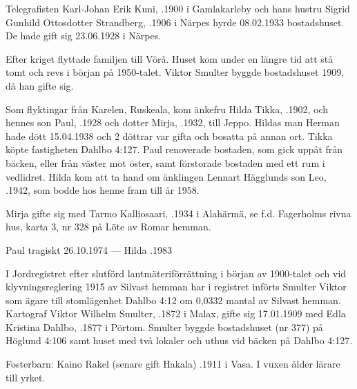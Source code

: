 Telegrafisten Karl-Johan Erik Kuni, .1900 i Gamlakarleby och hans hustru Sigrid Gunhild Ottosdotter Strandberg, .1906 i Närpes hyrde 08.02.1933 bostadshuset. De hade gift sig 23.06.1928 i Närpes.
\begin{jhchildren}
  \item {}
  \item {}
\end{jhchildren}
Efter kriget flyttade familjen till Vörå. Huset kom under en längre tid	att stå tomt och revs i början på 1950-talet. Viktor Smulter byggde	bostadshuset 1909, då han gifte sig.


%
Som flyktingar från Karelen, Ruskeala, kom änkefru Hilda Tikka, .1902, och hennes son Paul, .1928 och dotter Mirja, .1932, till Jeppo. Hildas man Herman hade dött 15.04.1938 och 2 döttrar var gifta och bosatta på annan ort. Tikka köpte fastigheten Dahlbo 4:127. Paul renoverade bostaden, som gick uppåt från bäcken, eller från väster mot öster, samt förstorade bostaden med ett rum i vedlidret. Hilda kom att ta hand om änklingen Lennart Hägglunds son Leo, .1942, som bodde hos henne fram till år 1958.

Mirja gifte sig med Tarmo Kalliosaari, .1934 i Alahärmä, se f.d. Fagerholms rivna hus, karta 3, nr 328 på Löte av Romar hemman.

Paul \textdied tragiskt 26.10.1974 --- Hilda .1983


%
I Jordregistret efter slutförd lantmäteriförrättning i början av 1900-talet	och vid klyvningsreglering 1915 av Silvast hemman har i registret införts	Smulter Viktor som ägare till stomlägenhet Dahlbo 4:12 om 0,0332 mantal av Silvast hemman. Kartograf Viktor Wilhelm Smulter, .1872 i Malax, gifte sig 17.01.1909 med Edla Kristina Dahlbo, .1877 i 	Pörtom. Smulter byggde bostadshuset (nr 377) på Höglund 4:106 samt huset med två lokaler och uthus vid bäcken på Dahlbo 4:127.

Fosterbarn: Kaino Rakel (senare gift Hakala) .1911 i Vasa. I vuxen ålder lärare till yrket.

